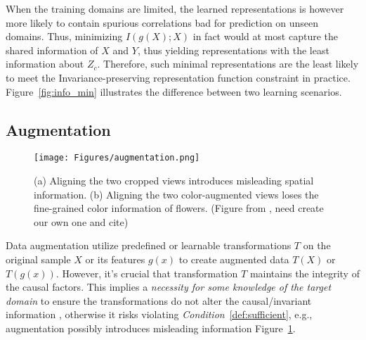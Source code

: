 When the training domains are limited, the learned representations is however more likely to contain spurious correlations bad for prediction on unseen domains. Thus, minimizing $I(g(X);X)$ in fact would at most capture the shared information of $X$ and $Y$, thus yielding representations with the least information about $Z_c$. Therefore, such minimal representations are the least likely to meet the Invariance-preserving representation function constraint in practice. Figure~\ref{fig:info_min} illustrates the difference between two learning scenarios.




\subsection{Augmentation} 

\begin{figure}[h!]
    \centering
\texttt{[image: Figures/augmentation.png]}
    \caption{(a) Aligning
the two cropped views introduces misleading spatial information.
(b) Aligning the two color-augmented views loses the fine-grained
color information of flowers. (Figure from \citep{zhang2022rethinking}, need create our own one and cite)}
    \label{fig:aug}
\end{figure}

Data augmentation utilize predefined or learnable transformations $T$ on the original sample $X$ or its features $g(x)$ to create augmented data $T(X)$ or $T(g(x))$. However, it's crucial that transformation $T$ maintains the integrity of the causal factors. This implies a \textit{necessity for some knowledge of the target domain} to ensure the transformations do not alter the causal/invariant information \citep{gao2023out}, otherwise it risks violating \textit{Condition}~\ref{def:sufficient}, e.g., augmentation possibly introduces misleading information \citep{zhang2022rethinking} Figure~\ref{fig:aug}.
\label{sec:augmentation}

